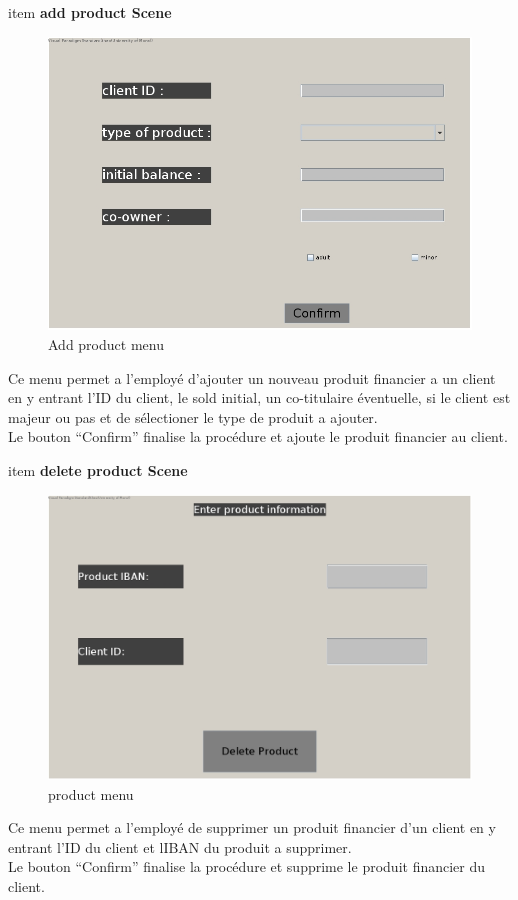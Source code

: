 \documentclass[../rapport.tex]{subfiles}
\begin{document}
\begin{enumerate}
item \textbf{add product Scene} \\
		\begin{figure}[h!]
				\centering \includegraphics[scale=0.2]{ressources/photos_diagrammes/app2/gui/addFinancialProductMenu.jpg}
				\caption{Add product menu}
		\end{figure}
Ce menu permet a l'employé d'ajouter un nouveau produit financier a un client en y entrant l'ID du client, le sold initial, un co-titulaire éventuelle, si le client est majeur ou pas et de sélectioner le type de produit a ajouter.\\
Le bouton ``Confirm'' finalise la procédure et ajoute le produit financier au client.\\

\newpage

item \textbf{delete product Scene} \\
		\begin{figure}[h!]
				\centering \includegraphics[scale=0.2]{ressources/photos_diagrammes/app2/gui/deleteMenu.jpg}
				\caption{ product menu}
		\end{figure}
Ce menu permet a l'employé de supprimer un produit financier d'un client en y entrant l'ID du client et lIBAN du produit a supprimer.\\
Le bouton ``Confirm'' finalise la procédure et supprime le produit financier du client.\\


\end{enumerate}
\end{document}
